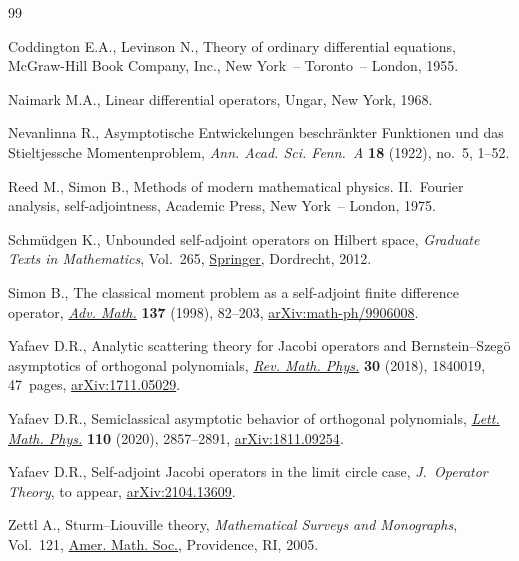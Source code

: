 \begin{thebibliography}{99}
\footnotesize\itemsep=0pt

Coddington E.A., Levinson N., Theory of ordinary differential equations,
 McGraw-Hill Book Company, Inc., New York~-- Toronto~-- London, 1955.

Naimark M.A., Linear differential operators, Ungar, New York, 1968.

Nevanlinna R., Asymptotische Entwickelungen beschr\"ankter Funktionen und das
 Stieltjessche Momentenproblem, \textit{Ann. Acad. Sci. Fenn.~A} \textbf{18}
 (1922), no.~5, 1--52.

Reed M., Simon B., Methods of modern mathematical physics. {II}.~Fourier
 analysis, self-adjointness, Academic Press, New York~-- London, 1975.

Schm\"udgen K., Unbounded self-adjoint operators on {H}ilbert space,
 \textit{Graduate Texts in Mathematics}, Vol.~265, \href{https://doi.org/10.1007/978-94-007-4753-1}{Springer}, Dordrecht, 2012.

Simon B., The classical moment problem as a self-adjoint finite difference
 operator, \href{https://doi.org/10.1006/aima.1998.1728}{\textit{Adv. Math.}} \textbf{137} (1998), 82--203,
 \href{https://arxiv.org/abs/math-ph/9906008}{arXiv:math-ph/9906008}.

Yafaev D.R., Analytic scattering theory for {J}acobi operators and
 {B}ernstein--{S}zeg\"{o} asymptotics of orthogonal polynomials, \href{https://doi.org/10.1142/S0129055X18400196}{\textit{Rev.
 Math. Phys.}} \textbf{30} (2018), 1840019, 47~pages, \href{https://arxiv.org/abs/1711.05029}{arXiv:1711.05029}.

Yafaev D.R., Semiclassical asymptotic behavior of orthogonal polynomials,
 \href{https://doi.org/10.1007/s11005-020-01313-w}{\textit{Lett. Math. Phys.}} \textbf{110} (2020), 2857--2891,
 \href{https://arxiv.org/abs/1811.09254}{arXiv:1811.09254}.

Yafaev D.R., Self-adjoint {J}acobi operators in the limit circle case,
 \textit{J.~Operator Theory}, {t}o appear, \href{https://arxiv.org/abs/2104.13609}{arXiv:2104.13609}.

Zettl A., Sturm--{L}iouville theory, \textit{Mathematical Surveys and
 Monographs}, Vol.~121, \href{https://doi.org/10.1090/surv/121}{Amer. Math. Soc.}, Pro\-vidence, RI, 2005.

\end{thebibliography}
